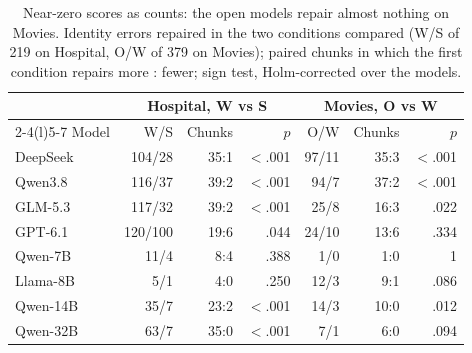 \begin{table}[t]
  \caption{Near-zero scores as counts: the open models repair almost nothing on Movies. Identity errors repaired in the
  two conditions compared (W/S of 219 on Hospital, O/W of 379 on Movies); paired chunks in
  which the first condition repairs more : fewer; sign test, Holm-corrected over the models.}
  \label{tab:counts}
  \small
  \setlength{\tabcolsep}{3.5pt}
  \begin{tabular*}{\columnwidth}{@{\extracolsep{\fill}}l rrr rrr@{}}
    \toprule
    & \multicolumn{3}{c}{Hospital, W vs S} & \multicolumn{3}{c}{Movies, O vs W} \\
    \cmidrule(lr){2-4}\cmidrule(l){5-7}
    Model & W/S & Chunks & $p$ & O/W & Chunks & $p$ \\
    \midrule
    DeepSeek & 104/28 & 35:1 & $<$.001 & 97/11 & 35:3 & $<$.001 \\
    Qwen3.8 & 116/37 & 39:2 & $<$.001 & 94/7 & 37:2 & $<$.001 \\
    GLM-5.3 & 117/32 & 39:2 & $<$.001 & 25/8 & 16:3 & .022 \\
    GPT-6.1 & 120/100 & 19:6 & .044 & 24/10 & 13:6 & .334 \\
    \midrule
    Qwen-7B & 11/4 & 8:4 & .388 & 1/0 & 1:0 & 1 \\
    Llama-8B & 5/1 & 4:0 & .250 & 12/3 & 9:1 & .086 \\
    Qwen-14B & 35/7 & 23:2 & $<$.001 & 14/3 & 10:0 & .012 \\
    Qwen-32B & 63/7 & 35:0 & $<$.001 & 7/1 & 6:0 & .094 \\
    \bottomrule
  \end{tabular*}
\end{table}
